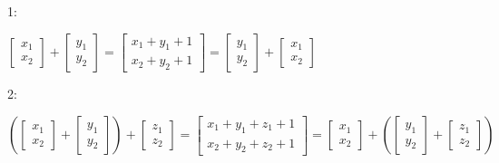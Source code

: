 		\begin{solution}
		    
		    1:\\
		    
		    \begin{center}
		        $
		        \begin{bmatrix}
		         x_1 \\ x_2
		        \end{bmatrix}
		        +
		        \begin{bmatrix}
		         y_1 \\ y_2
		        \end{bmatrix}
		        =
		        \begin{bmatrix}
		         x_1+y_1+1 \\ x_2 + y_2+1
		        \end{bmatrix}
		        =
		        \begin{bmatrix}
		         y_1 \\ y_2
		        \end{bmatrix}
		        +
		        \begin{bmatrix}
		         x_1 \\ x_2
		        \end{bmatrix}
		        $
		    \end{center}
		    
		    2:\\
		    \begin{center}
		    $
		    \left(
		    \begin{bmatrix}
		         x_1 \\ x_2
		        \end{bmatrix}
		        +
		        \begin{bmatrix}
		         y_1 \\ y_2
		        \end{bmatrix}
		    \right)
		    +
		    \begin{bmatrix}
		         z_1 \\ z_2
		        \end{bmatrix}
		        =
		        \begin{bmatrix}
		         x_1+y_1+z_1+1 \\ x_2 + y_2+z_2+1
		        \end{bmatrix}
		        =
		        \begin{bmatrix}
		         x_1 \\ x_2
		        \end{bmatrix}
		        +
		        \left(
		        \begin{bmatrix}
		         y_1 \\ y_2
		        \end{bmatrix}
		        +
		        \begin{bmatrix}
		         z_1 \\ z_2
		        \end{bmatrix}
		        \right)
		    $
		    \end{center}
		    

\end{solution}

